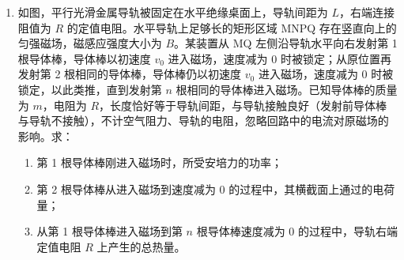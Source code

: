 \documentclass[\gkver]{gaokaozhenti}
\begin{document}
\begin{enumerate}
{从最低点到该位置由动能定理 $\frac{1}{2}mv_{0}'^{2} = mg \cdot 5L + \frac{1}{2}mv'^{2}$

解得 $v_{0}' = 2\sqrt{15} \Ums$
}

\item
如图，平行光滑金属导轨被固定在水平绝缘桌面上，导轨间距为 $L$，右端连接阻值为 $R$ 的定值电阻。水平导轨上足够长的矩形区域 MNPQ 存在竖直向上的匀强磁场，磁感应强度大小为 $B$。某装置从 MQ 左侧沿导轨水平向右发射第 1 根导体棒，导体棒以初速度 $v_{0}$ 进入磁场，速度减为 0 时被锁定；从原位置再发射第 2 根相同的导体棒，导体棒仍以初速度 $v_{0}$ 进入磁场，速度减为 0 时被锁定，以此类推，直到发射第 $n$ 根相同的导体棒进入磁场。已知导体棒的质量为 $m$，电阻为 $R$，长度恰好等于导轨间距，与导轨接触良好（发射前导体棒与导轨不接触），不计空气阻力、导轨的电阻，忽略回路中的电流对原磁场的影响。求：
\begin{enumerate}
\item
第 1 根导体棒刚进入磁场时，所受安培力的功率；
\item
第 2 根导体棒从进入磁场到速度减为 0 的过程中，其横截面上通过的电荷量；
\item
从第 1 根导体棒进入磁场到第 $n$ 根导体棒速度减为 0 的过程中，导轨右端定值电阻 $R$ 上产生的总热量。
\end{enumerate}

\onepicture[align=right, w=7.40cm]{}

\end{enumerate}
\end{document}
